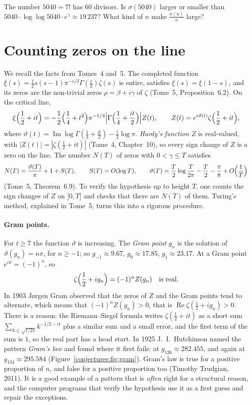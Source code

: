 \begin{think}
The number $5040=7!$ has $60$ divisors. Is $\sigma(5040)$ larger or smaller than $5040\cdot\log\log5040\cdot e^\gamma\approx19\,237$? What kind of $n$
make $\frac{\sigma(n)}n$ large?
\end{think}

\section{Counting zeros on the line}

We recall the facts from Tomes~4 and~5. The completed function $\xi(s)=\frac12s(s-1)\pi^{-s/2}\Gamma(\frac s2)\zeta(s)$ is entire, satisfies
$\xi(s)=\xi(1-s)$, and its zeros are the non-trivial zeros $\rho=\beta+i\gamma$ of $\zeta$ (Tome~5, Proposition~6.2). On the critical line,
\[
\xi\Bigl(\frac12+it\Bigr)=-\frac12\Bigl(\frac14+t^2\Bigr)\pi^{-1/4}\Bigl|\Gamma\Bigl(\frac14+\frac{it}2\Bigr)\Bigr|Z(t),\qquad Z(t)=e^{i\vartheta(t)}\zeta\Bigl(\frac12+it\Bigr),
\]
where $\vartheta(t)=\operatorname{Im}\log\Gamma(\frac14+\frac{it}2)-\frac t2\log\pi$. \emph{Hardy's function} $Z$ is real-valued, with $|Z(t)|=|\zeta(\frac12+it)|$
(Tome~4, Chapter~10), so every sign change of $Z$ is a zero on the line. The number $N(T)$ of zeros with $0<\gamma\le T$ satisfies
\[
N(T)=\frac{\vartheta(T)}\pi+1+S(T),\qquad S(T)=O(\log T),\qquad\vartheta(T)=\frac T2\log\frac T{2\pi}-\frac T2-\frac\pi8+O\Bigl(\frac1T\Bigr)
\]
(Tome~5, Theorem~6.9). To verify the hypothesis up to height $T$, one counts the sign changes of $Z$ on $]0,T]$ and checks that there are $N(T)$ of
them. Turing's method, explained in Tome~5, turns this into a rigorous procedure.

\paragraph{Gram points.} For $t\ge7$ the function $\vartheta$ is increasing. The \emph{Gram point} $g_n$ is the solution of $\vartheta(g_n)=n\pi$, for
$n\ge-1$; so $g_{-1}\approx9.67$, $g_0\approx17.85$, $g_1\approx23.17$. At a Gram point $e^{i\vartheta}=(-1)^n$, so
\[
\zeta\Bigl(\frac12+ig_n\Bigr)=(-1)^nZ(g_n)\quad\text{is real}.
\]
In 1903 J\o rgen Gram observed that the zeros of $Z$ and the Gram points tend to alternate, which means that $(-1)^nZ(g_n)>0$, that is
$\operatorname{Re}\zeta(\frac12+ig_n)>0$. There is a reason: the Riemann--Siegel formula writes $\zeta(\frac12+it)$ as a short sum
$\sum_{k\le\sqrt{t/2\pi}}k^{-1/2-it}$ plus a similar sum and a small error, and the first term of the sum is $1$, so the real part has a head start. In 1925
J.~I.~Hutchinson named the pattern \emph{Gram's law} and found where it first fails: at $g_{126}\approx282.455$, and again at $g_{134}\approx295.584$
(Figure~\ref{conjectures:fig:gram}). Gram's law is true for a positive proportion of $n$, and false for a positive proportion too (Timothy Trudgian, 2011). It is a good example of a
pattern that is \emph{often} right for a structural reason, and the computer programs that verify the hypothesis use it as a first guess and repair the
exceptions.

